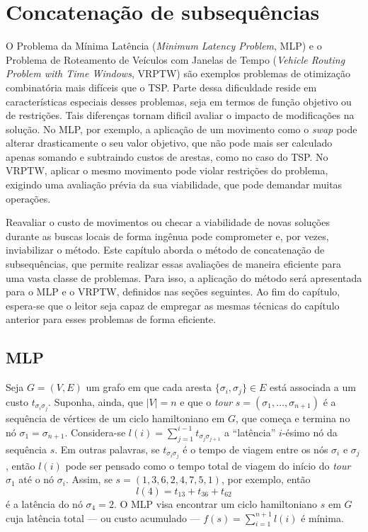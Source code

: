 \chapter{Concatenação de subsequências}
\thispagestyle{empty}
O Problema da Mínima Latência (\textit{Minimum Latency Problem}, MLP)  e o Problema de Roteamento de Veículos com Janelas de Tempo (\textit{Vehicle Routing Problem with Time Windows}, VRPTW)  são exemplos problemas de otimização combinatória mais difíceis que o TSP. Parte dessa dificuldade reside em características especiais desses problemas, seja em termos de função objetivo ou de restrições. Tais diferenças tornam dificil avaliar o impacto de modificações na solução. No MLP, por exemplo, a aplicação de um movimento como o \textit{swap} pode alterar drasticamente o seu valor objetivo, que não pode mais ser calculado apenas somando e subtraindo custos de arestas, como no caso do TSP. No VRPTW, aplicar o mesmo movimento pode violar restrições do problema, exigindo uma avaliação prévia da sua viabilidade, que pode demandar muitas operações.

Reavaliar o custo de movimentos ou checar a viabilidade de novas soluções durante as buscas locais de forma ingênua pode comprometer e, por vezes, inviabilizar o método. Este capítulo aborda o método de concatenação de subsequências, que permite realizar essas avaliações de maneira eficiente para uma vasta classe de problemas. Para isso, a aplicação do método será apresentada para o MLP e o VRPTW, definidos nas seções seguintes. Ao fim do capítulo, espera-se que o leitor seja capaz de empregar as mesmas técnicas do capítulo anterior para esses problemas de forma eficiente.

\section{MLP}
Seja \(G = (V, E)\) um grafo em que cada aresta $\{\sigma_i, \sigma_j\} \in E$ está associada a um custo \(t_{{\sigma_i}{\sigma_j}}\). Suponha, ainda, que $|V| = n$ e que o \textit{tour} $s = (\sigma_1, \dots, \sigma_{n+1})$ é a sequência de vértices de um ciclo hamiltoniano em $G$, que começa e termina no nó $\sigma_1 = \sigma_{n+1}$. Considera-se $l(i) = \sum_{j=1}^{i-1} t_{{\sigma_j}{\sigma_{j+1}}}$ a ``latência'' $i$-ésimo nó da sequência $s$. Em outras palavras, se $t_{{\sigma_i}{\sigma_j}}$ é o tempo de viagem entre os nós $\sigma_i$ e $\sigma_j$, então $l(i)$ pode ser pensado como o tempo total de viagem do início do \textit{tour} $\sigma_1$ até o nó $\sigma_i$. Assim, se \(s = (1,3,6,2,4,7,5,1)\), por exemplo, então \[l(4) = t_{{1}{3}} + t_{{3}{6}} + t_{{6}{2}}\] é a latência do nó $\sigma_4 = 2$. O MLP visa encontrar um ciclo hamiltoniano $s$ em $G$ cuja latência total --- ou custo acumulado ---  \(f(s) = \sum_{i = 1}^{n+1} l(i) \) é mínima. 

